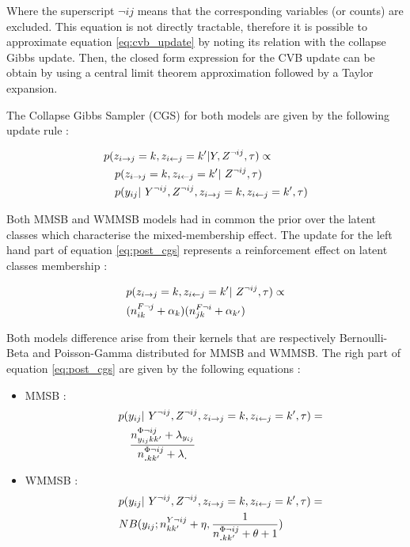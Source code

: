 Where the superscript $\neg ij$ means that the corresponding variables (or counts) are excluded.
This equation is not directly tractable, therefore it is possible to approximate equation \eqref{eq:cvb_update} by noting its relation with the collapse Gibbs update. Then,  the closed form expression for the CVB update can be obtain by using a central limit theorem approximation followed by a Taylor expansion.

The Collapse Gibbs Sampler (CGS) for both models are given by the following update rule :

\begin{align} \label{eq:post_cgs}
    &p(\zij=k, \zji=k' | Y, Z^{\neg ij}, \tau) \propto  \nonumber\\
    & \quad p(\zij=k, \zji=k' | Z^{\neg ij}, \tau) \nonumber \\
    & \quad p(y_{ij} | Y^{\neg ij}, Z^{\neg ij}, \zij=k, \zji=k', \tau)
\end{align}

Both MMSB and WMMSB models had in common the prior over the latent classes which characterise the mixed-membership effect. The update for the left hand part of equation \eqref{eq:post_cgs} represents a reinforcement effect on latent classes membership :

\begin{align}
    & p(\zij=k, \zji=k' | Z^{\neg ij}, \tau) \propto  \nonumber\\
    & (n^{F\neg j}_{ik} + \alpha_k) (n^{F\neg i}_{jk} + \alpha_{k'}) 
\end{align}


Both models difference arise from their kernels that are respectively Bernoulli-Beta and Poisson-Gamma distributed for MMSB and WMMSB. The righ part of equation \eqref{eq:post_cgs} are given by the following equations :

\begin{itemize}
    \item MMSB : {\setlength{\mathindent}{0cm} \begin{align} \quad & p(y_{ij} | Y^{\neg ij}, Z^{\neg ij}, \zij=k, \zji=k', \tau) = \nonumber \\ & \quad  \frac{ n^{\Phi\neg ij}_{y_{ij}kk'} + \lambda_{y_{ij}}}{n^{\Phi\neg ij}_{\bm{.}kk'} + \lambda_{\bm{.}}}\end{align}}
        \item WMMSB : {\setlength{\mathindent}{0cm} \begin{align} &\quad p(y_{ij} | Y^{\neg ij}, Z^{\neg ij}, \zij=k, \zji=k', \tau) = \nonumber\\& \quad  NB(y_{ij}; n^{Y\neg ij}_{kk'} + \eta, \frac{1}{n^{\Phi\neg ij}_{\bm{.}kk'} + \theta + 1} )\end{align}}
\end{itemize}

